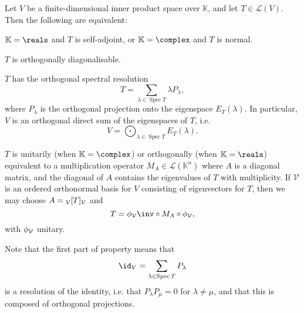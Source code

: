\documentclass[article, a4paper, 11pt, oneside]{memoir}
\numberwithin{equation}{chapter}
\newcommand{\calL}{\mathcal{L}}
\newcommand{\calV}{\mathcal{V}}
\DeclareMathOperator{\spec}{Spec}
\begin{document}
\begin{theorem}
    \label{thm:spectral-theorem}
    Let $V$ be a finite-dimensional inner product space over $\mathbb{K}$, and let $T \in \calL(V)$. Then the following are equivalent:
    \begin{enumthm}
        \item \label{enum:spectral-selfadjoint-normal} $\mathbb{K} = \reals$ and $T$ is self-adjoint, or $\mathbb{K} = \complex$ and $T$ is normal.
        
        \item \label{enum:spectral-orthogonally-diagonalisable} $T$ is orthogonally diagonalisable.

        \item \label{enum:spectral-operator-decomposition} $T$ has the orthogonal spectral resolution
        \begin{equation*}
            T
                = \sum_{\lambda \in \spec T} \lambda P_\lambda,
        \end{equation*}
        where $P_\lambda$ is the orthogonal projection onto the eigenspace $E_T(\lambda)$. In particular, $V$ is an orthogonal direct sum of the eigenspaces of $T$, i.e.
        \begin{equation*}
            V
                = \bigodot_{\lambda \in \spec T} E_T(\lambda).
        \end{equation*}

        \item \label{enum:spectral-multiplication-operator} $T$ is unitarily (when $\mathbb{K} = \complex$) or orthogonally (when $\mathbb{K} = \reals$) equivalent to a multiplication operator $M_A \in \calL(\mathbb{K}^n)$ where $A$ is a diagonal matrix, and the diagonal of $A$ contains the eigenvalues of $T$ with multiplicity. If $\calV$ is an ordered orthonormal basis for $V$ consisting of eigenvectors for $T$, then we may choose $A = \mr{\calV}{T}{\calV}$ and
        \begin{equation*}
            T
                = \coordmap{\calV}\inv \circ M_A \circ \coordmap{\calV},
        \end{equation*}
        with $\coordmap{\calV}$ unitary.
    \end{enumthm}
\end{theorem}
%
Note that the first part of property  means that
%
\begin{equation*}
    \id_V
        = \sum_{\lambda \in \spec T} P_\lambda
\end{equation*}
%
is a resolution of the identity, i.e. that $P_\lambda P_\mu = 0$ for $\lambda \neq \mu$, and that this is composed of orthogonal projections.
\end{document}
